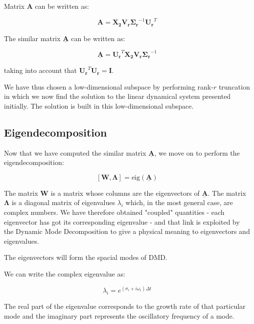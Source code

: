 \documentclass[10pt,twocolumn]{article}
\begin{document}
Matrix $\bm{A}$ can be written as:

\begin{equation} \label{eq:A}
\bm{A} = \bm{X_2} \bm{V_r} \bm{\Sigma_r}^{-1} \bm{U_r}^T
\end{equation}

The similar matrix $\underline{\bm{A}}$ can be written as:

\begin{equation} \label{eq:A_underline}
\underline{\bm{A}} = \bm{U_r}^T \bm{X_2} \bm{V_r} \bm{\Sigma_r}^{-1} 
\end{equation}

taking into account that $\bm{U_r}^T \bm{U_r} = \bm{I}$.

We have thus chosen a low-dimensional subspace by performing rank-$r$ truncation in which we now find the solution to the linear dynamical system presented initially. The solution is built in this low-dimensional subspace.

\subsection{Eigendecomposition}

Now that we have computed the similar matrix $\underline{\bm{A}}$, we move on to perform the eigendecomposition:

\begin{equation} \label{eq:A_underline}
[\bm{W}, \bm{\Lambda}] = \text{eig}(\underline{\bm{A}})
\end{equation}

The matrix $\bm{W}$ is a matrix whose columns are the eigenvectors of $\underline{\bm{A}}$. The matrix $\bm{\Lambda}$ is a diagonal matrix of eigenvalues $\lambda_i$ which, in the most general case, are complex numbers. We have therefore obtained "coupled" quantities - each eigenvector has got its corresponding eigenvalue - and that link is exploited by the Dynamic Mode Decomposition to give a physical meaning to eigenvectors and eigenvalues.

The eigenvectors will form the spacial modes of DMD. 

We can write the complex eigenvalue as:

\begin{equation} \label{eq:A_underline}
\lambda_i = e^{(\sigma_i + i \omega_i) \Delta t} 
\end{equation}

The real part of the eigenvalue corresponds to the growth rate of that particular mode and the imaginary part represents the oscillatory frequency of a mode.
\end{document}
